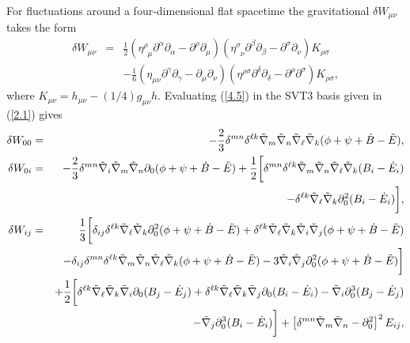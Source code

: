For fluctuations around a four-dimensional flat spacetime the gravitational $\delta W_{\mu\nu}$  takes the form \cite{mannheim_2006}
%
\begin{eqnarray}
\delta W_{\mu\nu}&=&\frac{1}{2}(\eta^{\rho}_{\phantom{\rho} \mu} \partial^{\alpha}\partial_{\alpha}-\partial^{\rho}\partial_{\mu})
(\eta^{\sigma}_{\phantom{\sigma} \nu} \partial^{\beta}\partial_{\beta}-
\partial^{\sigma}\partial_{\nu})K_{\rho \sigma}
\nonumber\\
&&- \frac{1}{6}(\eta_{\mu \nu} \partial^{\gamma}\partial_{\gamma}-
\partial_{\mu}\partial_{\nu})(\eta^{\rho \sigma} \partial^{\delta}\partial_{\delta}-
\partial^{\rho}\partial^{\sigma})K_{\rho\sigma},
\label{4.5}
\end{eqnarray}
%
where $K_{\mu\nu}=h_{\mu\nu}-(1/4)g_{\mu\nu}h$. Evaluating (\ref{4.5}) in the SVT3 basis given in (\ref{2.1}) gives \cite{amarasinghe_2019}
%
\begin{eqnarray}
\delta W_{00}  &=& -\frac{2}{3} \delta^{mn}\delta^{\ell k}\tilde{\nabla}_m\tilde{\nabla}_n\tilde{\nabla}_{\ell}\tilde{\nabla}_k (\phi + \psi +\dot{B}-\ddot{E}),
\nonumber\\	
\delta W_{0i} &=&  -\frac{2}{3} \delta^{mn}\tilde{\nabla}_i\tilde{\nabla}_m\tilde{\nabla}_n\partial_0(\phi +\psi +\dot{B}-\ddot{E})
+\frac{1}{2}\bigg[\delta^{mn}\delta^{\ell k}\tilde{\nabla}_m\tilde{\nabla}_n\tilde{\nabla}_{\ell}\tilde{\nabla}_k(B_i - \dot{E}_i)
\nonumber\\
&& -  \delta^{\ell k}\tilde{\nabla}_{\ell}\tilde{\nabla}_k \partial_0^2(B_i - \dot{E}_i)\bigg],
\nonumber\\	
\delta W_{ij}  &=& \frac{1}{3}\bigg{[} \delta_{ij}\delta^{\ell k}\tilde{\nabla}_{\ell}\tilde{\nabla}_k  \partial_0^2(\phi+ \psi+\dot{B}-\ddot{E}) + \delta^{\ell k}\tilde{\nabla}_{\ell}\tilde{\nabla}_k \tilde{\nabla}_i\tilde{\nabla}_j (\phi + \psi +\dot{B}-\ddot{E}) 
\nonumber\\
&&- \delta_{ij} \delta^{mn}\delta^{\ell k}\tilde{\nabla}_m\tilde{\nabla}_n\tilde{\nabla}_{\ell}\tilde{\nabla}_k(\phi + \psi +\dot{B}-\ddot{E}) -3\tilde{\nabla}_i\tilde{\nabla}_j \partial_0^2(\phi + \psi +\dot{B}-\ddot{E})\bigg{] }
\nonumber\\
&&+\frac{1}{2}\bigg[ \delta^{\ell k}\tilde{\nabla}_{\ell}\tilde{\nabla}_k \tilde{\nabla}_i   \partial_0(B_j - \dot{E}_j)+ \delta^{\ell k}\tilde{\nabla}_{\ell}\tilde{\nabla}_k \tilde{\nabla}_j \partial_0(B_i - \dot{E}_i) - \tilde{\nabla}_i\partial_0^3(B_j - \dot{E}_j)
\nonumber\\
&&-\tilde{\nabla}_j\partial_0^3(B_i - \dot{E}_i)\bigg] +\left[\delta^{mn}\tilde{\nabla}_m\tilde{\nabla}_n-\partial_0^2\right]^2E_{ij},
\label{4.6}
\end{eqnarray}
